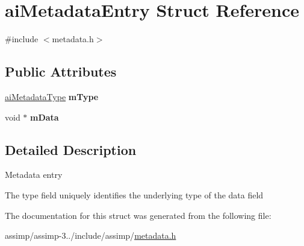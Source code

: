 \hypertarget{structai_metadata_entry}{\section{ai\+Metadata\+Entry Struct Reference}
\label{structai_metadata_entry}
}


{\ttfamily \#include $<$metadata.\+h$>$}

\subsection*{Public Attributes}
\begin{DoxyCompactItemize}
\item 
\hypertarget{structai_metadata_entry_a075b29cd710e153f5402f479a7a10aee}{\hyperlink{metadata_8h_aa910906c37416da57bb36335a4d04232}{ai\+Metadata\+Type} {\bfseries m\+Type}}\label{structai_metadata_entry_a075b29cd710e153f5402f479a7a10aee}

\item 
\hypertarget{structai_metadata_entry_a97fe80a47846374edd38bda5b50b99b3}{void $\ast$ {\bfseries m\+Data}}\label{structai_metadata_entry_a97fe80a47846374edd38bda5b50b99b3}

\end{DoxyCompactItemize}


\subsection{Detailed Description}
Metadata entry

The type field uniquely identifies the underlying type of the data field 

The documentation for this struct was generated from the following file\+:\begin{DoxyCompactItemize}
\item 
assimp/assimp-\/3../include/assimp/\hyperlink{metadata_8h}{metadata.\+h}\end{DoxyCompactItemize}
